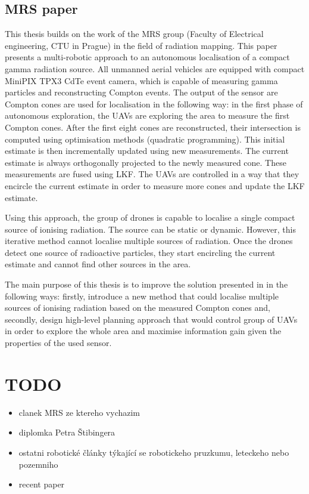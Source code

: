 \subsection{ MRS paper}
This thesis builds on the work of the MRS group (Faculty of Electrical engineering, CTU in Prague) in the field of radiation mapping. 
This paper \cite{baca2021gamma} presents a multi-robotic approach to an autonomous localisation of a compact gamma radiation source. 
All unmanned aerial vehicles are equipped with compact MiniPIX TPX3 CdTe event camera, which is capable of measuring gamma particles and reconstructing Compton events. 
The output of the sensor are Compton cones are used for localisation in the following way:
in the first phase of autonomous exploration, the \ac{UAV}s are exploring the area to measure the first Compton cones. 
After the first eight cones are reconstructed, their intersection is computed using optimisation methods (quadratic programming). 
This initial estimate is then incrementally updated using new measurements. 
The current estimate is always orthogonally projected to the newly measured cone. 
These measurements are fused using \ac{LKF}. 
The \ac{UAV}s are controlled in a way that they encircle the current estimate in order to measure more cones and update the \ac{LKF} estimate.

Using this approach, the group of drones is capable to localise a single compact source of ionising radiation. 
The source can be static or dynamic. 
However, this iterative method cannot localise multiple sources of radiation.
Once the drones detect one source of radioactive particles, they start encircling the current estimate and cannot find other sources in the area.

The main purpose of this thesis is to improve the solution presented in \cite{baca2021gamma} in the following ways: firstly, introduce a new method that could localise multiple sources of ionising radiation based on the measured Compton cones and, 
secondly, 
design high-level planning approach that would control group of \ac{UAV}s in order to explore the whole area and maximise information gain given the properties of the used sensor.



\section{TODO}
\begin{itemize}
\item clanek MRS ze ktereho vychazim
\item diplomka Petra Štibingera
\item ostatni robotické články týkající se robotickeho pruzkumu, leteckeho nebo pozemniho
\item recent paper \cite{Mascarich2022}
\end{itemize}
